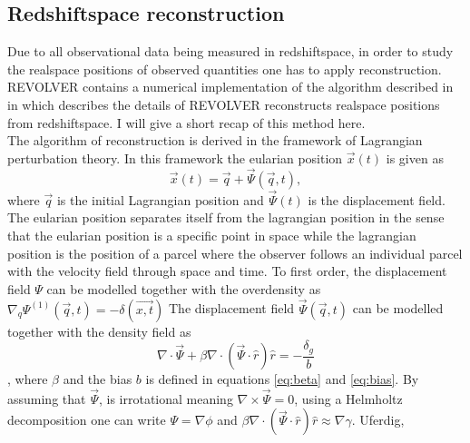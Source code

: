 \subsection{Redshiftspace reconstruction}\label{sec:reconstruction}
Due to all observational data being measured in redshiftspace, in order to study
the realspace positions of observed quantities one has to apply reconstruction. REVOLVER contains a numerical implementation of
the algorithm described in \cite{Nadathur_2018} in which describes the details
of REVOLVER reconstructs realspace positions from redshiftspace. I will give a
short recap of this method here.\\\indent
The algorithm of reconstruction is derived in the framework of Lagrangian
perturbation theory. In this framework the eularian position $\vec{x}(t)$ is
given as
\begin{equation}
    \vec{x}(t)=\vec{q}+\vec{\Psi}(\vec{q},t),
\end{equation}
where $\vec{q}$ is the initial Lagrangian position and $\vec{\Psi}(t)$ is the
displacement field. The eularian position separates itself from the lagrangian
position in the sense that the eularian position is a specific point in space
while the lagrangian position is the position of a parcel where the observer
follows an individual parcel with the velocity field through space and time.
To first order, the displacement field $\Psi$ can be modelled together with the
overdensity as $\nabla_q\Psi^{(1)}(\vec{q},t)=-\delta(\vec{x,t})$
The displacement field $\vec{\Psi}(\vec{q},t)$ can be modelled together with the
density field as
\begin{equation}
    \nabla\cdot\vec{\Psi}+\beta\nabla\cdot(\vec{\Psi}\cdot\hat{r})\hat{r}=-\frac{\delta_g}{b}
\end{equation}
\cite{recondisplace}, where $\beta$ and the bias $b$ is defined in equations
\ref{eq:beta} and \ref{eq:bias}. By assuming that $\vec{\Psi}$, is irrotational
meaning $\nabla\times\vec{\Psi}=0$, using a Helmholtz decomposition one can
write $\Psi=\nabla\phi$ and
$\beta\nabla\cdot(\vec{\Psi}\cdot\hat{r})\hat{r}\approx\nabla\gamma$.
Uferdig, 